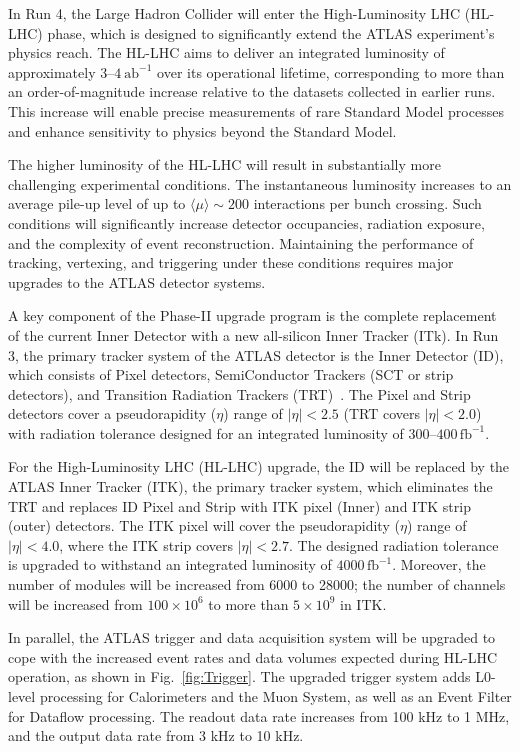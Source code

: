 In Run 4, the Large Hadron Collider will enter the High-Luminosity LHC (HL-LHC) phase, which is designed to significantly extend the ATLAS experiment's physics reach. The HL-LHC aims to deliver an integrated luminosity of approximately $3$--$4~\mathrm{ab}^{-1}$ over its operational lifetime, corresponding to more than an order-of-magnitude increase relative to the datasets collected in earlier runs. This increase will enable precise measurements of rare Standard Model processes and enhance sensitivity to physics beyond the Standard Model.

The higher luminosity of the HL-LHC will result in substantially more challenging experimental conditions. The instantaneous luminosity increases to an average pile-up level of up to $\langle\mu\rangle \sim 200$ interactions per bunch crossing. Such conditions will significantly increase detector occupancies, radiation exposure, and the complexity of event reconstruction. Maintaining the performance of tracking, vertexing, and triggering under these conditions requires major upgrades to the ATLAS detector systems.

A key component of the Phase-II upgrade program is the complete replacement of the current Inner Detector with a new all-silicon Inner Tracker (ITk). In Run 3, the primary tracker system of the ATLAS detector is the Inner Detector (ID), which consists of Pixel detectors, SemiConductor Trackers (SCT or strip detectors), and Transition Radiation Trackers (TRT)~\cite{GarciaAlonso:2024itk}. The Pixel and Strip detectors cover a pseudorapidity ($\eta$) range of $|\eta| < 2.5$ (TRT covers $|\eta| < 2.0$) with radiation tolerance designed for an integrated luminosity of $300\text{--}400\,\text{fb}^{-1}$.

For the High-Luminosity LHC (HL-LHC) upgrade, the ID will be replaced by the ATLAS Inner Tracker (ITK), the primary tracker system, which eliminates the TRT and replaces ID Pixel and Strip with ITK pixel (Inner) and ITK strip (outer) detectors. The ITK pixel will cover the pseudorapidity ($\eta$) range of $|\eta| < 4.0$, where the ITK strip covers $|\eta| < 2.7$. The designed radiation tolerance is upgraded to withstand an integrated luminosity of $4000\,\text{fb}^{-1}$. Moreover, the number of modules will be increased from 6000 to 28000; the number of channels will be increased from $100 \times 10^6$ to more than $5 \times 10^9$ in ITK. 

In parallel, the ATLAS trigger and data acquisition system will be upgraded to cope with the increased event rates and data volumes expected during HL-LHC operation, as shown in Fig.~\ref{fig:Trigger}. The upgraded trigger system adds L0-level processing for Calorimeters and the Muon System, as well as an Event Filter for Dataflow processing. The readout data rate increases from 100 kHz to 1 MHz, and the output data rate from 3 kHz to 10 kHz. 

